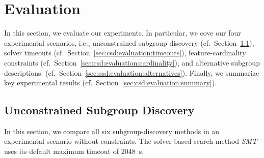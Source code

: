 \documentclass{article}
\theoremstyle{definition}
\begin{document}
\section{Evaluation}
\label{sec:csd:evaluation}

In this section, we evaluate our experiments.
In particular, we cove our four experimental scenarios, i.e., unconstrained subgroup discovery (cf.~Section~\ref{sec:csd:evaluation:unconstrained}), solver timeouts (cf.~Section~\ref{sec:csd:evaluation:timeouts}), feature-cardinality constraints (cf.~Section~\ref{sec:csd:evaluation:cardinality}), and alternative subgroup descriptions. (cf.~Section~\ref{sec:csd:evaluation:alternatives}).
Finally, we summarize key experimental results (cf.~Section~\ref{sec:csd:evaluation:summary}).

\subsection{Unconstrained Subgroup Discovery}
\label{sec:csd:evaluation:unconstrained}

In this section, we compare all six subgroup-discovery methods in an experimental scenario without constraints.
The solver-based search method \emph{SMT} uses its default maximum timeout of 2048~s.
\end{document}
